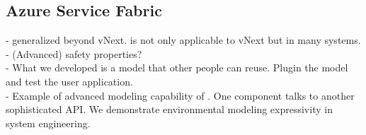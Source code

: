 

\subsection{Azure Service Fabric}
\label{sec:cases:fabric}

- \psharp generalized beyond vNext. \psharp is not only applicable to vNext but in many systems.\\
- (Advanced) safety properties?\\
- What we developed is a model that other people can reuse. Plugin the model and test the user application.\\
- Example of advanced modeling capability of \psharp. One component talks to another sophisticated API. We demonstrate environmental modeling expressivity in system engineering.


